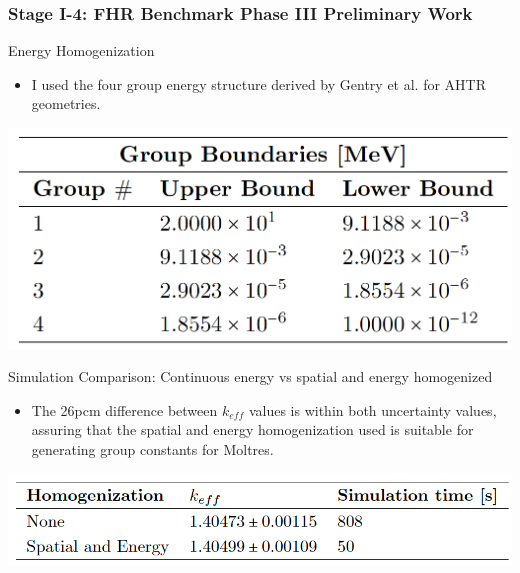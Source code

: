 \begin{frame}
    \frametitle{Stage I-4: FHR Benchmark Phase III Preliminary Work}
    \begin{block}{Energy Homogenization}
        \begin{itemize}
            \item I used the four group energy structure derived by Gentry et al. 
            \cite{gentry_development_2016} for AHTR geometries. 
        \end{itemize}
        \vspace{-0.4cm}
        \begin{table}[]
            \centering
            \begin{minipage}[c]{0.5\textwidth}
                \centering
                \includegraphics[width=0.6\linewidth]{figures/ahtr-energy-discr.png}
            \end{minipage}\hfill
            \begin{minipage}[c]{0.5\textwidth}
            \caption{4-group energy structures for AHTR geometry 
            derived by \cite{gentry_development_2016}.}
        \end{minipage}
        \end{table}
    \end{block}
    \vspace{-0.3cm}
    \begin{block}{Simulation Comparison: Continuous energy vs spatial 
        and energy homogenized}
        \begin{itemize}
            \item The 26pcm difference between $k_{eff}$ values is within both uncertainty values, 
            assuring that the spatial and energy homogenization used is suitable for generating 
            group constants for Moltres. 
        \end{itemize}
        \vspace{-0.3cm}
        \begin{table}[]
            \centering
            \begin{minipage}[c]{0.6\textwidth}
                \centering
                \includegraphics[width=0.8\linewidth]{figures/ahtr-homogenization.png}

\end{minipage}
\end{table}
\end{block}
\end{frame}
